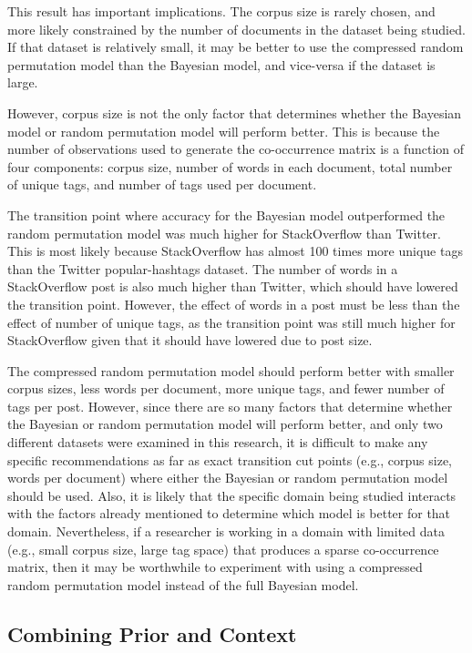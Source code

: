 \documentclass[man,donotrepeattitle]{apa6}
\begin{document}
This result has important implications.
The corpus size is rarely chosen, and more likely constrained by the number of documents in the dataset being studied.
If that dataset is relatively small, it may be better to use the compressed random permutation model than the Bayesian model, and vice-versa if the dataset is large.

However, corpus size is not the only factor that determines whether the Bayesian model or random permutation model will perform better.
This is because the number of observations used to generate the co-occurrence matrix is a function of four components:
corpus size, number of words in each document, total number of unique tags, and number of tags used per document.

The transition point where accuracy for the Bayesian model outperformed the random permutation model was much higher for StackOverflow than Twitter.
This is most likely because StackOverflow has almost \num{100} times more unique tags than the Twitter popular-hashtags dataset.
The number of words in a StackOverflow post is also much higher than Twitter, which should have lowered the transition point.
However, the effect of words in a post must be less than the effect of number of unique tags, as the transition point was still much higher for StackOverflow given that it should have lowered due to post size.

The compressed random permutation model should perform better with smaller corpus sizes, less words per document, more unique tags, and fewer number of tags per post.
However, since there are so many factors that determine whether the Bayesian or random permutation model will perform better,
and only two different datasets were examined in this research,
it is difficult to make any specific recommendations as far as exact transition cut points (e.g., corpus size, words per document) where either the Bayesian or random permutation model should be used.
Also, it is likely that the specific domain being studied interacts with the factors already mentioned to determine which model is better for that domain.
Nevertheless, if a researcher is working in a domain with limited data (e.g., small corpus size, large tag space) that produces a sparse co-occurrence matrix,
then it may be worthwhile to experiment with using a compressed random permutation model instead of the full Bayesian model.

\subsection{Combining Prior and Context}
\end{document}
